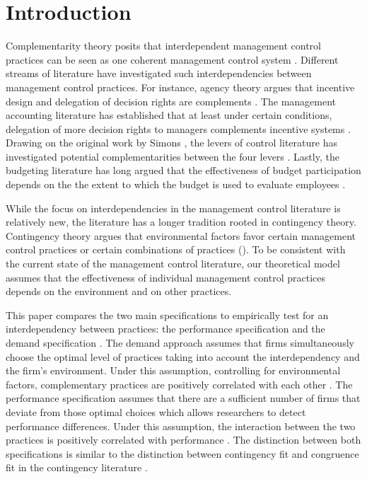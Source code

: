 \documentclass[12pt]{article}
\begin{document}
\section{Introduction}\label{introduction}

 Complementarity theory posits that interdependent management control practices can be seen as one coherent management control system \citep{Milgrom1995, Grabner2013}. Different streams of literature have investigated such interdependencies between management control practices. For instance, agency theory argues that incentive design and delegation of decision rights are complements \citep{Holmstrom1994}. The management accounting literature has established that at least under certain conditions, delegation of more decision rights to managers complements incentive systems \citep{Moers2006, Indjejikian2012, Bouwens2007}. Drawing on the original work by Simons \citetext{\citeyear{Simons1995}; \citeyear{Simons2000}}, the levers of control literature has investigated potential complementarities between the four levers \citep{Widener2007}. Lastly, the budgeting literature has long argued that the effectiveness of budget participation depends on the the extent to which the budget is used to evaluate employees \citep{Brownell1991, Dunk1993}.
 
While the focus on interdependencies in the management control literature is relatively new, the literature has a longer tradition rooted in contingency theory.  Contingency theory argues that environmental factors favor certain management control practices or certain combinations of practices (\citet{Grabner2013,Chenhall2003, otley_contingency_2016}). To be consistent with the current state of the management control literature, our theoretical model assumes that the effectiveness of individual management control practices depends on the environment and on other practices.
 
This paper compares the two main specifications to empirically test for an interdependency between practices: the performance specification and the demand specification \citep{Grabner2013}. The demand approach assumes that firms simultaneously choose the optimal level of practices taking into account the interdependency and the firm's environment. Under this assumption, controlling for environmental factors, complementary practices are positively correlated with each other \citep{Arora1996,Grabner2013,Johansson2018, Hofmann2015OrganizationalChoices}. The performance specification assumes that there are a sufficient number of firms that deviate from those optimal choices which allows researchers to detect performance differences. Under this assumption, the interaction between the two practices is positively correlated with performance \citep{Athey1998,Carree2011, Grabner2013, Hofmann2015OrganizationalChoices}. The distinction between both specifications is similar to the distinction between contingency fit and congruence fit in the contingency literature \citep{VandeVen1985a, Gerdin2004}. 
\end{document}
